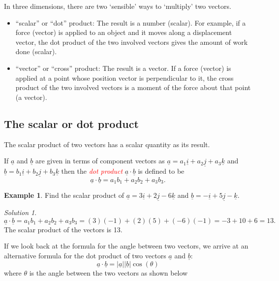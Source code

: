 \documentclass[
  11pt,
  oneside]{book}
\newcommand{\slide}{}
\theoremstyle{definition}
\theoremstyle{definition}
\newtheorem{example}{Example}[chapter]
\theoremstyle{definition}
\theoremstyle{definition}
\theoremstyle{remark}
\newtheorem*{solution}{Solution}
\begin{document}
In three dimensions, there are two `sensible' ways to `multiply' two vectors.

\begin{itemize}
\item
  ``scalar'' or ``dot'' product: The result is a number (scalar). For example, if a force (vector) is applied to an object and it moves along a displacement vector, the dot product of the two involved vectors gives the amount of work done (scalar).
\item
  ``vector'' or ``cross'' product: The result is a vector. If a force (vector) is applied at a point whose position vector is perpendicular to it, the cross product of the two involved vectors is a moment of the force about that point (a vector).
\end{itemize}

\slide

\subsection{The scalar or dot product}\label{the-scalar-or-dot-product}

The scalar product of two vectors has a scalar quantity as its result.

If \(\underline a\) and \(\underline b\) are given in terms of component vectors as \(\underline a = a_1\underline i + a_2\underline j + a_3\underline k\) and \(\underline b = b_1\underline i + b_2\underline j + b_3\underline k\) then the \textcolor{red}{\em dot product} \(\underline{a}\cdot \underline{b}\) is defined to be
\[
\underline a \cdot\underline b = a_1b_1 + a_2b_2 + a_3b_3.
\]
\slide

\begin{example}
Find the scalar product of \(\underline a = 3\underline i + 2\underline j - 6\underline k\) and \(\underline b = -\underline i + 5\underline j - \underline k\).
\end{example}

\begin{solution}
\[
\underline a\cdot\underline b = a_1b_1 + a_2b_2 + a_3b_3 = (3)(-1)+(2)(5)+(-6)(-1) = -3+10+6=13.
\]
The scalar product of the vectors is 13.
\end{solution}

\slide

If we look back at the formula for the angle between two vectors, we arrive at an alternative formula for the dot product of two vectors \(\underline a\) and \(\underline b\):
\[
\underline a \cdot\underline b = |\underline a||\underline b|\cos(\theta)
\]
where \(\theta\) is the angle between the two vectors as shown below
\end{document}
